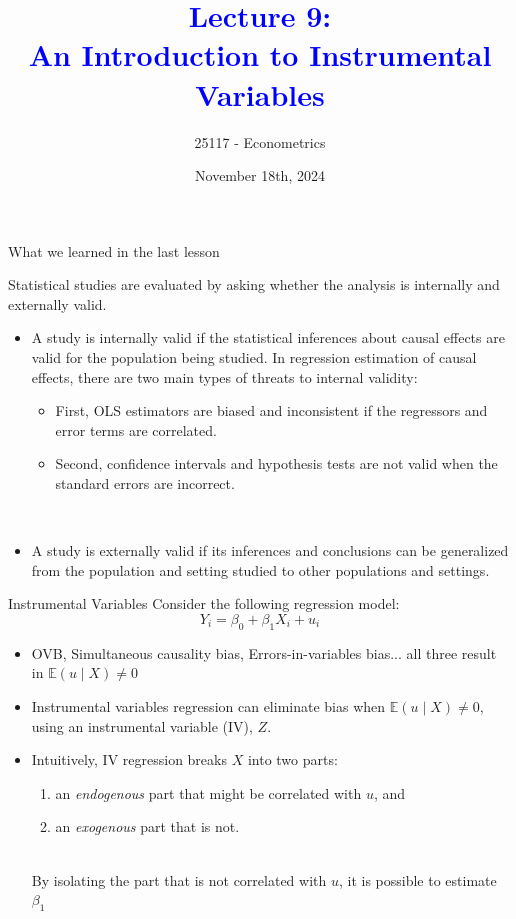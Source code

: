 \documentclass[notes,10pt, aspectratio=169]{beamer}
\title[]{\textcolor{blue}{Lecture 9:\\An Introduction to Instrumental Variables}}
\author{25117 - Econometrics}
\institute[shortinst]{Universitat Pompeu Fabra}
\date{November 18th, 2024}
\begin{document}
\begin{frame}[plain]
\maketitle
\end{frame}



\begin{frame}{What we learned in the last lesson}
\item Statistical studies are evaluated by asking whether the analysis is internally and externally valid.\\[1em]
\begin{itemize}
    \item A study is internally valid if the statistical inferences about causal effects are valid for the population being studied. In regression estimation of causal effects, there are two main types of threats to internal validity:
    \begin{itemize}
        \item First, OLS estimators are biased and inconsistent if the regressors and error terms are correlated.
        \item Second, confidence intervals and hypothesis tests are not valid when the standard errors are incorrect.
    \end{itemize}\\[1em]
    \item A study is externally valid if its inferences and conclusions can be generalized from the population and setting studied to other populations and settings.
\end{itemize} 
\end{frame}


\begin{frame}{Instrumental Variables}
Consider the following regression model:
\begin{equation*}
    Y_i = \beta_0 + \beta_1 X_i + u_i
\end{equation*}
\begin{itemize}
    \item OVB,  Simultaneous causality bias, Errors-in-variables bias... all three result in $\mathbb{E}(u\mid X)\neq0$\\[1em]
    \item Instrumental variables regression can eliminate bias when $\mathbb{E}(u\mid X)\neq0$, using an instrumental variable (IV), $Z$.\\[1em]
    \item Intuitively, IV regression breaks $X$ into two parts:
    \begin{enumerate}
        \item an \textit{endogenous} part that might be correlated with $u$, and 
        \item an \textit{exogenous}  part that is not. 
    \end{enumerate}\\[1em]
By isolating the part that is not correlated with $u$, it is possible to estimate $\beta_1$
\end{itemize}
\end{frame}
\end{document}
